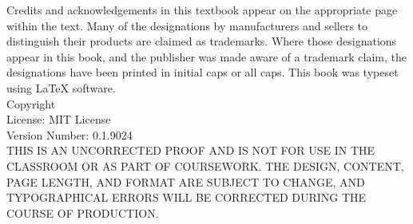 \documentclass{book}
\makeatletter
\newcommand{\booklicense}{MIT License}
\newcommand{\bookversion}{0.1.9024}
\newcommand{\bookauthor}{\@author}
\makeatother
\begin{document}
\thispagestyle{empty}

\begin{flushleft}
\vspace*{\fill}
Credits and acknowledgements in this textbook appear on the appropriate page within the text.
\newline
\newline
Many of the designations by manufacturers and sellers to distinguish their products are claimed as trademarks. Where those designations appear in this book, and the publisher was made aware of a trademark claim, the designations have been printed in initial caps or all caps.
\newline
\newline
This book was typeset using \LaTeX{} software.\\
\vspace{\fill}
Copyright \textcopyright{} \the\year{}  \bookauthor\\
License: \booklicense\\
Version Number: \bookversion\\
\vspace{1cm}
THIS IS AN UNCORRECTED PROOF AND IS NOT FOR USE IN THE CLASSROOM OR AS PART OF COURSEWORK. THE DESIGN, CONTENT, PAGE LENGTH, AND FORMAT ARE SUBJECT TO CHANGE, AND TYPOGRAPHICAL ERRORS WILL BE CORRECTED DURING THE COURSE OF PRODUCTION.
\end{flushleft}

\addtocounter{page}{2}



\setcounter{tocdepth}{3}
\tableofcontents

\mainmatter


















\end{document}
